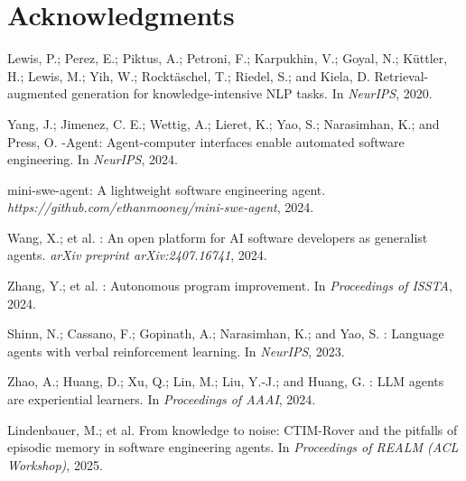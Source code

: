 \documentclass[letterpaper]{article} %
\begin{document}
\section*{Acknowledgments}


\begin{thebibliography}{}

Lewis, P.; Perez, E.; Piktus, A.; Petroni, F.; Karpukhin, V.; Goyal, N.; K\"{u}ttler, H.; Lewis, M.; Yih, W.; Rockt\"{a}schel, T.; Riedel, S.; and Kiela, D.
\newblock Retrieval-augmented generation for knowledge-intensive {NLP} tasks.
\newblock In \emph{NeurIPS}, 2020.

Yang, J.; Jimenez, C. E.; Wettig, A.; Lieret, K.; Yao, S.; Narasimhan, K.; and Press, O.
-Agent: Agent-computer interfaces enable automated software engineering.
\newblock In \emph{NeurIPS}, 2024.

mini-swe-agent: A lightweight software engineering agent.
\newblock \emph{https://github.com/ethanmooney/mini-swe-agent}, 2024.

Wang, X.; et al.
: An open platform for {AI} software developers as generalist agents.
\newblock \emph{arXiv preprint arXiv:2407.16741}, 2024.

Zhang, Y.; et al.
: Autonomous program improvement.
\newblock In \emph{Proceedings of ISSTA}, 2024.

Shinn, N.; Cassano, F.; Gopinath, A.; Narasimhan, K.; and Yao, S.
: Language agents with verbal reinforcement learning.
\newblock In \emph{NeurIPS}, 2023.

Zhao, A.; Huang, D.; Xu, Q.; Lin, M.; Liu, Y.-J.; and Huang, G.
: {LLM} agents are experiential learners.
\newblock In \emph{Proceedings of AAAI}, 2024.

Lindenbauer, M.; et al.
\newblock From knowledge to noise: {CTIM}-Rover and the pitfalls of episodic memory in software engineering agents.
\newblock In \emph{Proceedings of REALM (ACL Workshop)}, 2025.


\end{thebibliography}
\end{document}

